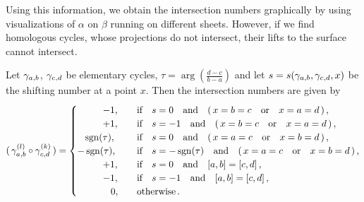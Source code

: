 \documentclass[main.tex]{subfiles}
\begin{document}
     Using this information, we obtain the intersection numbers graphically by using visualizations of $\alpha$ on $\beta$ running on different sheets.
     However, if we find homologous cycles, whose projections do not intersect, their lifts to the surface cannot intersect.
    
    
    \newpage
    \begin{thm}\label{thm:intsec_numb}
      Let $\gamma_{a,b}$, $\gamma_{c,d}$ be elementary cycles, $\tau = \arg\left(\frac{d-c}{b-a}\right)$ and let $s=s(\gamma_{a,b},\gamma_{c,d},x)$ be the
     shifting number at a point $x$. Then the intersection numbers are given by
      \begin{align}
       \begin{split}
        (\,\gamma_{a,b}^{(l)} \circ \gamma_{c,d}^{(k)}\,) = 
        \begin{cases}
            \hspace*{0.95cm} -1, \quad & \text{if} \quad s=0 \quad \text{and} \quad (\,x = b = c \quad \text{or} \quad x = a = d\,)\,,\\
	     \hspace*{0.95cm} +1, \quad &\text{if} \quad s=-1 \quad \text{and} \quad (\,x = b = c \quad \text{or} \quad x = a = d\,)\,,\\
          \quad\! \operatorname{sgn}(\tau), \quad & \text{if} \quad s=0 \quad \text{and} \quad (\,x = a = c \quad \text{or} \quad x = b = d\,)\,,\\
            -\operatorname{sgn}(\tau), \quad & \text{if} \quad s=-\operatorname{sgn}(\tau) \quad \text{and} \quad (\,x = a = c \quad \text{or} \quad x = b = d\,)\,,\\
          \hspace*{0.95cm} +1, \quad &\text{if} \quad s=0 \quad \text{and} \quad [a,b] = [c,d]\,,\\
          \hspace*{0.95cm} -1, \quad &\text{if} \quad s=-1 \quad \text{and} \quad [a,b] = [c,d]\,,\\
         \hspace*{0.95cm}  \quad\! 0, \quad &\text{otherwise}\,.
        \end{cases}
       \end{split}
      \end{align}
    \end{thm}
	   
\end{document}
